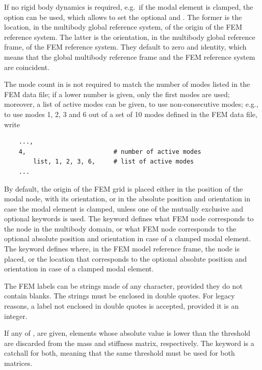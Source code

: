 If no rigid body dynamics is required, e.g.\ if the modal element
is clamped, the  option can be used, which allows
to set the optional 
and .
The former is the location, in the multibody
global reference system, of the origin of the FEM reference system.
The latter is the orientation,
in the multibody global reference frame,
of the FEM reference system.
They default to zero and identity, which means
that the global multibody reference frame
and the FEM reference system are coincident.

The mode count in  is not required to match
the number of modes listed in the FEM data file; if a lower number
is given, only the first  modes are used;
moreover, a list of active modes can be given, to use non-consecutive
modes; e.g., to use modes 1, 2, 3 and 6 out of a set of 10 modes
defined in the FEM data file, write
\begin{verbatim}
    ...,
    4,                        # number of active modes
        list, 1, 2, 3, 6,     # list of active modes
    ...
\end{verbatim}

By default, the origin of the FEM grid is placed either in the position
of the modal node, with its orientation, or in the absolute position 
and orientation in case the modal element is clamped, 
unless one of the mutually exclusive  
and  optional keywords is used.
The  keyword defines what FEM node corresponds 
to the  node in the multibody domain,
or what FEM node corresponds to the optional absolute position 
and orientation in case of a clamped modal element.
The  keyword defines where, in the FEM model
reference frame, the  node is placed, or the location
that corresponds to the optional absolute position and orientation
in case of a clamped modal element.

The FEM labels can be strings made of any character,
provided they do not contain blanks.
The strings must be enclosed in double quotes.
For legacy reasons, a label not enclosed in double quotes
is accepted, provided it is an integer.

If any of ,  are given,
elements whose absolute value is lower than the threshold
are discarded from the mass and stiffness matrix, respectively.
The keyword  is a catchall for both,
meaning that the same threshold must be used for both matrices.

